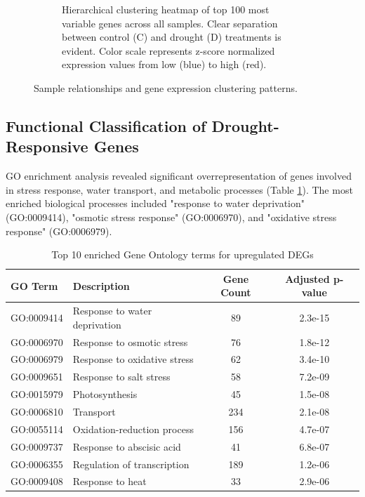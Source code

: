 \documentclass[11pt,a4paper]{article}
\begin{document}
\begin{figure}[H]
\begin{subfigure}[b]{0.48\textwidth}
        \caption{Hierarchical clustering heatmap of top 100 most variable genes across all samples. Clear separation between control (C) and drought (D) treatments is evident. Color scale represents z-score normalized expression values from low (blue) to high (red).}
        \label{fig:heatmap}
    \end{subfigure}
    \caption{Sample relationships and gene expression clustering patterns.}
    \label{fig:patterns}
\end{figure}

\subsection{Functional Classification of Drought-Responsive Genes}

GO enrichment analysis revealed significant overrepresentation of genes involved in stress response, water transport, and metabolic processes (Table \ref{tab:go_terms}). The most enriched biological processes included "response to water deprivation" (GO:0009414), "osmotic stress response" (GO:0006970), and "oxidative stress response" (GO:0006979).

\begin{table}[H]
\centering
\caption{Top 10 enriched Gene Ontology terms for upregulated DEGs}
\label{tab:go_terms}
\begin{tabular}{llcc}
\toprule
GO Term & Description & Gene Count & Adjusted p-value \\
\midrule
GO:0009414 & Response to water deprivation & 89 & 2.3e-15 \\
GO:0006970 & Response to osmotic stress & 76 & 1.8e-12 \\
GO:0006979 & Response to oxidative stress & 62 & 3.4e-10 \\
GO:0009651 & Response to salt stress & 58 & 7.2e-09 \\
GO:0015979 & Photosynthesis & 45 & 1.5e-08 \\
GO:0006810 & Transport & 234 & 2.1e-08 \\
GO:0055114 & Oxidation-reduction process & 156 & 4.7e-07 \\
GO:0009737 & Response to abscisic acid & 41 & 6.8e-07 \\
GO:0006355 & Regulation of transcription & 189 & 1.2e-06 \\
GO:0009408 & Response to heat & 33 & 2.9e-06 \\
\bottomrule
\end{tabular}
\end{table}
\end{document}
